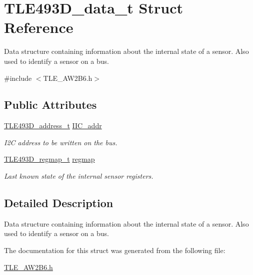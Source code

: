 \hypertarget{struct_t_l_e493_d__data__t}{}\section{T\+L\+E493\+D\+\_\+data\+\_\+t Struct Reference}
\label{struct_t_l_e493_d__data__t}


Data structure containing information about the internal state of a sensor. Also used to identify a sensor on a bus.  




{\ttfamily \#include $<$T\+L\+E\+\_\+\+A\+W2\+B6.\+h$>$}

\subsection*{Public Attributes}
\begin{DoxyCompactItemize}
\item 
\mbox{\label{struct_t_l_e493_d__data__t_acbaf31ad01a738bc1b2ddd7384428fcc}} 
\mbox{\hyperlink{_t_l_e___a_w2_b6__defines_8h_a06dad61359b7c858980d4da8c520f06d}{T\+L\+E493\+D\+\_\+address\+\_\+t}} \mbox{\hyperlink{struct_t_l_e493_d__data__t_acbaf31ad01a738bc1b2ddd7384428fcc}{I\+I\+C\+\_\+addr}}
\begin{DoxyCompactList}\small\item\em I2C address to be written on the bus. \end{DoxyCompactList}\item 
\mbox{\label{struct_t_l_e493_d__data__t_a597087e1d5a535852c4fb75033351f91}} 
\mbox{\hyperlink{struct_t_l_e493_d__regmap__t}{T\+L\+E493\+D\+\_\+regmap\+\_\+t}} \mbox{\hyperlink{struct_t_l_e493_d__data__t_a597087e1d5a535852c4fb75033351f91}{regmap}}
\begin{DoxyCompactList}\small\item\em Last known state of the internal sensor registers. \end{DoxyCompactList}\end{DoxyCompactItemize}


\subsection{Detailed Description}
Data structure containing information about the internal state of a sensor. Also used to identify a sensor on a bus. 

The documentation for this struct was generated from the following file\+:\begin{DoxyCompactItemize}
\item 
\mbox{\hyperlink{_t_l_e___a_w2_b6_8h}{T\+L\+E\+\_\+\+A\+W2\+B6.\+h}}\end{DoxyCompactItemize}
